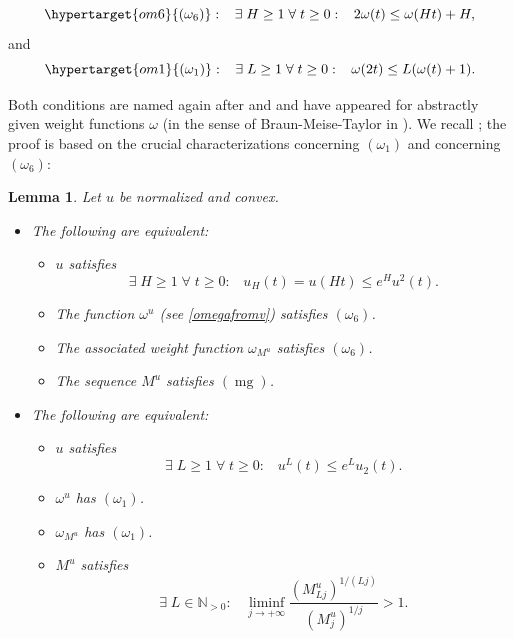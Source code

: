 \documentclass[10pt]{amsart}%
\numberwithin{equation}{section}
\theoremstyle{plain}
\newtheorem{lemma}[proposition]{Lemma}
\newcommand{\NN}{\mathbb{N}}
\let\on=\operatorname
\begin{document}
$$\hypertarget{om6}{(\omega_6)}:\;\;\; \exists\;H\ge 1\;\forall\;t\ge 0:\;\;\;2\omega(t)\le\omega(H t)+H,$$
and
$$\hypertarget{om1}{(\omega_1)}:\;\;\; \exists\;L\ge 1\;\forall\;t\ge 0:\;\;\;\omega(2t)\le L(\omega(t)+1).$$

Both conditions are named again after \cite{compositionpaper} and \cite{dissertation} and have appeared for abstractly given weight functions $\omega$ (in the sense of Braun-Meise-Taylor in \cite{BraunMeiseTaylor90}). We recall \cite[Lemmas 2.17 \& 2.20]{weightedentirecharacterization}; the proof is based on the crucial characterizations \cite[Thm. 3.1]{subaddlike} concerning \hyperlink{om1}{$(\omega_1)$} and \cite[Prop. 3.6]{Komatsu73} concerning \hyperlink{om6}{$(\omega_6)$}:

\begin{lemma}\label{techlemma}
Let $u$ be normalized and convex.
\begin{itemize}
\item[$(I)$] The following are equivalent:

\begin{itemize}
\item[$(a)$] $u$ satisfies
\begin{equation}\label{om6forv}
\exists\;H\ge 1\;\forall\;t\ge 0:\;\;\;u_H(t)=u(Ht)\le e^Hu^2(t).
\end{equation}

\item[$(b)$] The function $\omega^u$ (see \eqref{omegafromv}) satisfies \hyperlink{om6}{$(\omega_6)$}.

\item[$(c)$] The associated weight function $\omega_{M^u}$ satisfies \hyperlink{om6}{$(\omega_6)$}.

\item[$(d)$] The sequence $M^u$ satisfies \hyperlink{mg}{$(\on{mg})$}.
\end{itemize}

\item[$(II)$] The following are equivalent:

\begin{itemize}
\item[$(a)$] $u$ satisfies
\begin{equation}\label{om1forv}
\exists\;L\ge 1\;\forall\;t\ge 0:\;\;\;u^L(t)\le e^Lu_2(t).
\end{equation}

\item[$(b)$] $\omega^u$ has \hyperlink{om1}{$(\omega_1)$}.

\item[$(c)$] $\omega_{M^u}$ has \hyperlink{om1}{$(\omega_1)$}.

\item[$(d)$] $M^u$ satisfies
\begin{equation}\label{om1omegaMchar}
\exists\;L\in\NN_{>0}:\;\;\;\liminf_{j\rightarrow+\infty}\frac{(M^u_{Lj})^{1/(Lj)}}{(M^u_j)^{1/j}}>1.
\end{equation}
\end{itemize}
\end{itemize}
\end{lemma}
\end{document}

